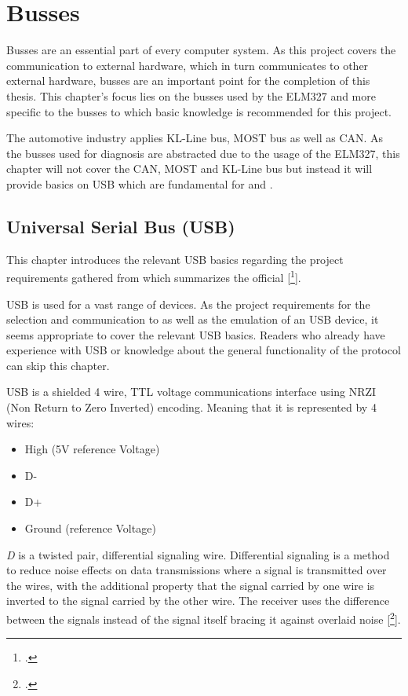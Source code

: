 \setcounter{section}{0}
\section{Busses}

Busses are an essential part of every computer system. As this project covers the communication to external hardware, which in turn communicates to other 
external hardware, busses are an important point for the completion of this thesis. This chapter’s focus lies on the busses used by the ELM327 and more 
specific to the busses to which basic knowledge is recommended for this project.

The automotive industry applies KL-Line bus, MOST bus as well as CAN. As the busses used for diagnosis are abstracted due to the usage of the ELM327, 
this chapter will not cover the CAN, MOST and KL-Line bus but instead it will provide basics on USB which are fundamental for  
and .

\subsection{Universal Serial Bus (USB)}

This chapter introduces the relevant USB basics regarding the project requirements gathered from \cite{USBNUT} which summarizes the official  
[\footcite[pp. 36ff., 199ff., 260-274]{USB}].

USB is used for a vast range of devices. As the project requirements for the selection and communication to as well as the emulation of an USB device,
it seems appropriate to cover the relevant USB basics. Readers who already have experience with USB or knowledge about the general functionality of the 
protocol can skip this chapter.

USB is a shielded 4 wire, TTL voltage communications interface using NRZI (Non Return to Zero Inverted) encoding. Meaning that it is represented by 4 wires:

\begin{itemize}
\item High (5V reference Voltage)
\item D-
\item D+
\item Ground (reference Voltage)
\end{itemize}

\emph{D} is a twisted pair, differential signaling wire. Differential signaling is a method to reduce noise effects on data transmissions where a signal
is transmitted over the wires, with the additional property that the signal carried by one wire is inverted to the signal carried by the other wire. The 
receiver uses the difference between the signals instead of the signal itself bracing it against overlaid noise [\footcite{Massoud2001}].

